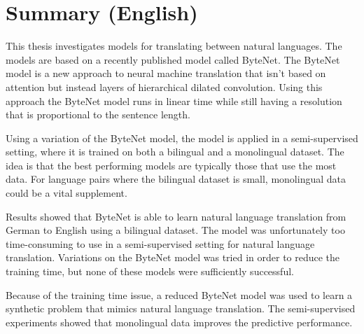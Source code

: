 \chapter{Summary (English)}

This thesis investigates models for translating between natural languages. The models are based on a recently published model called ByteNet. The ByteNet model is a new approach to neural machine translation that isn't based on attention but instead layers of hierarchical dilated convolution. Using this approach the ByteNet model runs in linear time while still having a resolution that is proportional to the sentence length.

Using a variation of the ByteNet model, the model is applied in a semi-supervised setting, where it is trained on both a bilingual and a monolingual dataset. The idea is that the best performing models are typically those that use the most data. For language pairs where the bilingual dataset is small, monolingual data could be a vital supplement.

Results showed that ByteNet is able to learn natural language translation from German to English using a bilingual dataset. The model was unfortunately too time-consuming to use in a semi-supervised setting for natural language translation. Variations on the ByteNet model was tried in order to reduce the training time, but none of these models were sufficiently successful.

Because of the training time issue, a reduced ByteNet model was used to learn a synthetic problem that mimics natural language translation. The semi-supervised experiments showed that monolingual data improves the predictive performance.
